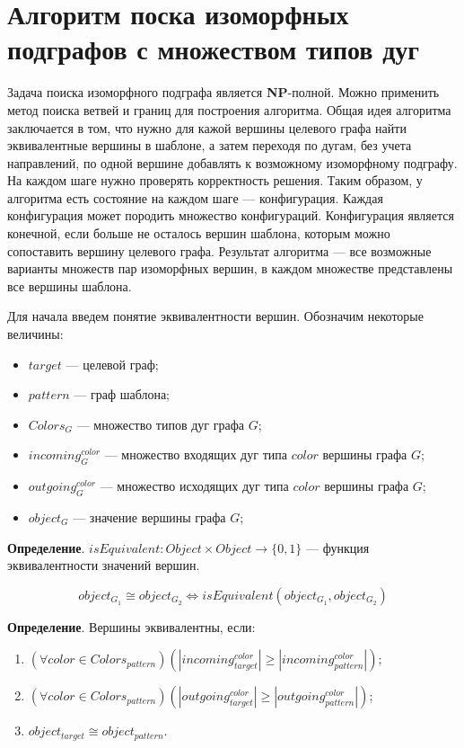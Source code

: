\section{Алгоритм поска изоморфных подграфов с множеством типов дуг}

Задача поиска изоморфного подграфа является \textbf{NP}-полной.
Можно применить метод поиска ветвей и границ для построения алгоритма.
Общая идея алгоритма заключается в том,
что нужно для кажой вершины целевого графа найти эквивалентные вершины в шаблоне,
а затем переходя по дугам, без учета направлений,
по одной вершине добавлять к возможному изоморфному подграфу.
На каждом шаге нужно проверять корректность решения.
Таким образом, у алгоритма есть состояние на каждом шаге --- конфигурация.
Каждая конфигурация может породить множество конфигураций.
Конфигурация является конечной, если больше не осталось вершин шаблона,
которым можно сопоставить вершину целевого графа.
Результат алгоритма --- все возможные варианты множеств пар изоморфных вершин,
в каждом множестве представлены все вершины шаблона.

Для начала введем понятие эквивалентности вершин.
Обозначим некоторые величины:
\begin{itemize}
\item $target$ --- целевой граф;
\item $pattern$ --- граф шаблона;
\item $Colors_G$ --- множество типов дуг графа $G$;
\item $incoming^{color}_G$ --- множество входящих дуг типа $color$ вершины графа $G$;
\item $outgoing^{color}_G$ --- множество исходящих дуг типа $color$ вершины графа $G$;
\item $object_G$ --- значение вершины графа $G$;
\end{itemize}

\textbf{Определение}. $isEquivalent: Object \times Object \to \{ 0, 1 \}$ ---
функция эквивалентности значений вершин.

$$object_{G_1} \cong object_{G_2} \iff isEquivalent(object_{G_1}, object_{G_2})$$

\textbf{Определение}. Вершины эквивалентны, если:
\begin{enumerate}
\item $( \forall color \in Colors_{pattern} ) ( |incoming^{color}_{target}| \ge |incoming^{color}_{pattern}| )$;
\item $( \forall color \in Colors_{pattern} ) ( |outgoing^{color}_{target}| \ge |outgoing^{color}_{pattern}| )$;
\item $object_{target} \cong object_{pattern}$.
\end{enumerate}

